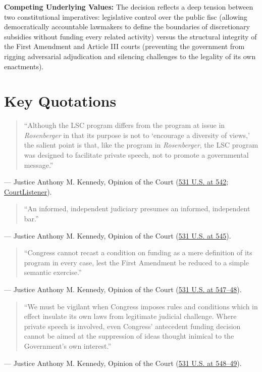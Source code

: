\documentclass[12pt]{article}
\begin{document}
\textbf{Competing Underlying Values:} The decision reflects a deep tension between two constitutional imperatives: legislative control over the public fisc (allowing democratically accountable lawmakers to define the boundaries of discretionary subsidies without funding every related activity) versus the structural integrity of the First Amendment and Article III courts (preventing the government from rigging adversarial adjudication and silencing challenges to the legality of its own enactments).

\section{Key Quotations}
\begin{quote}
``Although the LSC program differs from the program at issue in \textit{Rosenberger} in that its purpose is not to `encourage a diversity of views,' the salient point is that, like the program in \textit{Rosenberger}, the LSC program was designed to facilitate private speech, not to promote a governmental message.''
\end{quote}
\noindent --- Justice Anthony M. Kennedy, Opinion of the Court (\href{https://supreme.justia.com/cases/federal/us/531/533/}{531 U.S. at 542}; \href{https://www.courtlistener.com/opinion/2621077/legal-services-corp-v-velazquez/}{CourtListener}).

\begin{quote}
``An informed, independent judiciary presumes an informed, independent bar.''
\end{quote}
\noindent --- Justice Anthony M. Kennedy, Opinion of the Court (\href{https://supreme.justia.com/cases/federal/us/531/533/}{531 U.S. at 545}).

\begin{quote}
``Congress cannot recast a condition on funding as a mere definition of its program in every case, lest the First Amendment be reduced to a simple semantic exercise.''
\end{quote}
\noindent --- Justice Anthony M. Kennedy, Opinion of the Court (\href{https://supreme.justia.com/cases/federal/us/531/533/}{531 U.S. at 547--48}).

\begin{quote}
``We must be vigilant when Congress imposes rules and conditions which in effect insulate its own laws from legitimate judicial challenge. Where private speech is involved, even Congress' antecedent funding decision cannot be aimed at the suppression of ideas thought inimical to the Government's own interest.''
\end{quote}
\noindent --- Justice Anthony M. Kennedy, Opinion of the Court (\href{https://supreme.justia.com/cases/federal/us/531/533/}{531 U.S. at 548--49}).
\end{document}
